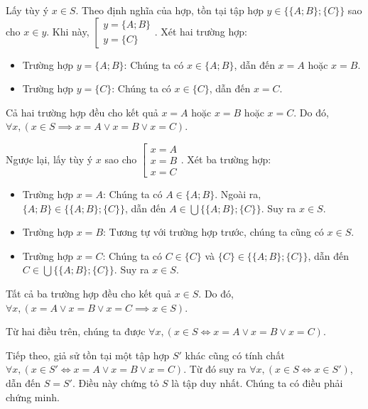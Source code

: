 Lấy tùy ý $x \in S$. Theo định nghĩa của hợp, tồn tại tập hợp $y \in \big\{\{A; B\}; \{C\}\big\}$ sao cho $x \in y$. Khi này, $\left[\begin{array}{l}
      y = \{A; B\} \\
      y = \{C\}
   \end{array}\right.$. Xét hai trường hợp:
\begin{itemize}
   \item \textcolor{colorEmphasis}{Trường hợp $y = \{A; B\}$}: Chúng ta có $x \in \{A; B\}$, dẫn đến $x = A$ hoặc $x = B$.
   \item \textcolor{colorEmphasisCyan}{Trường hợp $y = \{C\}$}: Chúng ta có $x \in \{C\}$, dẫn đến $x = C$.
\end{itemize}
Cả hai trường hợp đều cho kết quả $x = A$ hoặc $x = B$ hoặc $x = C$. Do đó, $\forall x, (x \in S \implies x = A \lor x = B \lor x = C)$.

Ngược lại, lấy tùy ý $x$ sao cho $\left[\begin{array}{l}
      x = A \\
      x = B \\
      x = C
   \end{array}\right.$. Xét ba trường hợp:
\begin{itemize}
   \item \textcolor{colorEmphasis}{Trường hợp $x = A$}: Chúng ta có $A \in \{A; B\}$. Ngoài ra, $\{A; B\} \in \big\{\{A; B\}; \{C\}\big\}$, dẫn đến $A \in \bigcup \big\{\{A; B\}; \{C\}\big\}$. Suy ra $x \in S$.
   \item \textcolor{colorEmphasisCyan}{Trường hợp $x = B$}: Tương tự với trường hợp trước, chúng ta cũng có $x \in S$.
   \item \textcolor{colorEmphasisGreen}{Trường hợp $x = C$}: Chúng ta có $C \in \{C\}$ và $\{C\} \in \big\{\{A; B\}; \{C\}\big\}$, dẫn đến $C \in \bigcup \big\{\{A; B\}; \{C\}\big\}$. Suy ra $x \in S$.
\end{itemize}
Tất cả ba trường hợp đều cho kết quả $x \in S$. Do đó, $\forall x, (x = A \lor x = B \lor x = C \implies x \in S)$.

Từ hai điều trên, chúng ta được $\forall x, (x \in S \iff x = A \lor x = B \lor x = C)$.

Tiếp theo, giả sử tồn tại một tập hợp $S'$ khác cũng có tính chất $\forall x, (x \in S' \iff x = A \lor x = B \lor x = C)$. Từ đó suy ra $\forall x, (x \in S \iff x \in S')$, dẫn đến $S = S'$. Điều này chứng tỏ $S$ là tập duy nhất. Chúng ta có điều phải chứng minh.

